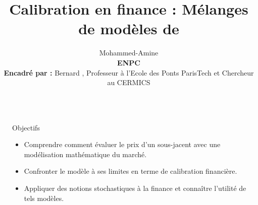 \documentclass[final]{beamer}
\title{Calibration en finance : Mélanges de modèles de \bsc{Black-Scholes}} %
\author{\bsc{Kheldouni} Mohammed-Amine
\\\vspace{1cm} \textbf{ENPC}
\\\vspace{1cm} \textbf{Encadr\'e par :}
Bernard \bsc{Lapeyre}, Professeur à l'Ecole des Ponts ParisTech et Chercheur au CERMICS} %
\institute{\vspace{-2cm}}
\newlength{\sepwid}
\newlength{\onecolwid}
\begin{document}

\setlength{\belowcaptionskip}{2ex} %
\setlength\belowdisplayshortskip{2ex} %

\begin{frame}[t] %

\begin{columns}[t] %

\begin{column}{\sepwid}\end{column} %

\begin{column}{\onecolwid} %


\begin{alertblock}{Objectifs}
\begin{itemize}
  \item Comprendre comment évaluer le prix d'un sous-jacent avec une modélisation mathématique du marché.
  \item Confronter le modèle à ses limites en terme de calibration financière.
  \item Appliquer des notions stochastiques à la finance et connaître l'utilité de tels modèles.
\end{itemize}

\end{alertblock}



\end{column}
\end{columns}
\end{frame}
\end{document}

